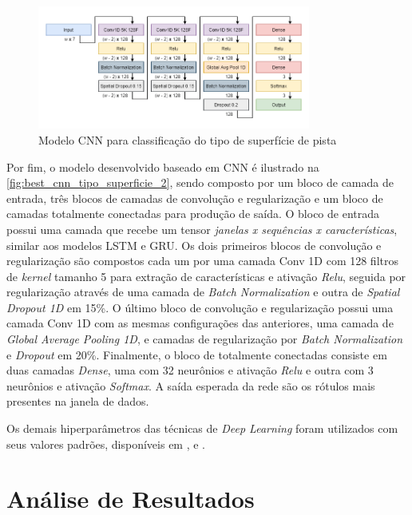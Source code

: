 \begin{figure}[h!]
  \centering
  \caption{Modelo CNN para classificação do tipo de superfície de pista}
  \label{fig:best_cnn_tipo_superficie_2}
  \includegraphics[width=0.8\textwidth]{figuras/fig_39.png}
\end{figure}

Por fim, o modelo desenvolvido baseado em CNN é ilustrado na \autoref{fig:best_cnn_tipo_superficie_2}, sendo composto por um bloco de camada de entrada, três blocos de camadas de convolução e regularização e um bloco de camadas totalmente conectadas para produção de saída. O bloco de entrada possui uma camada que recebe um tensor \emph{janelas x sequências x características}, similar aos modelos LSTM e GRU. Os dois primeiros blocos de convolução e regularização são compostos cada um por uma camada Conv 1D com 128 filtros de \textit{kernel} tamanho 5 para extração de características e ativação \textit{Relu}, seguida por regularização através de uma camada de \textit{Batch Normalization} e outra de \textit{Spatial Dropout 1D} em 15\%. O último bloco de convolução e regularização possui uma camada Conv 1D com as mesmas configurações das anteriores, uma camada de \textit{Global Average Pooling 1D}, e camadas de regularização por \textit{Batch Normalization} e \textit{Dropout} em 20\%. Finalmente, o bloco de totalmente conectadas consiste em duas camadas \textit{Dense}, uma com 32 neurônios e ativação \textit{Relu} e outra com 3 neurônios e ativação \textit{Softmax}. A saída esperada da rede são os rótulos mais presentes na janela de dados.

Os demais hiperparâmetros das técnicas de \textit{Deep Learning} foram utilizados com seus valores padrões, disponíveis em ,  e .

\section{Análise de Resultados}

